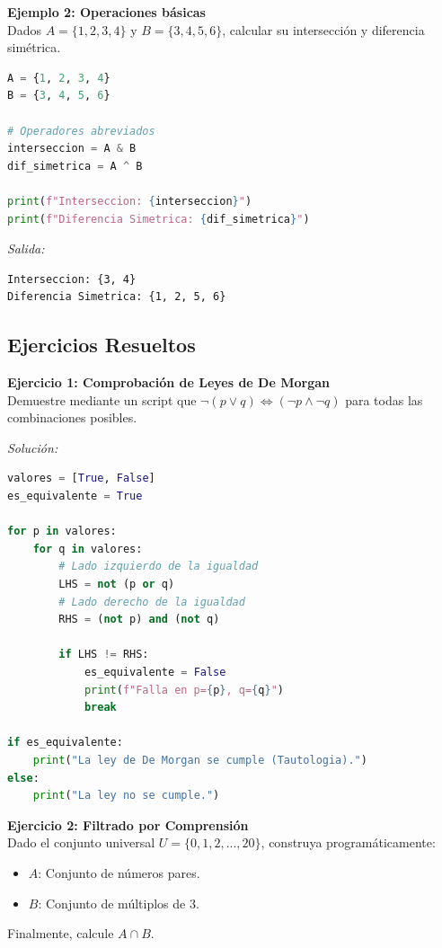 \noindent \textbf{Ejemplo 2: Operaciones básicas} \\
Dados $A = \{1, 2, 3, 4\}$ y $B = \{3, 4, 5, 6\}$, calcular su intersección y diferencia simétrica.

\begin{lstlisting}[language=Python, caption=Cálculo de intersección y diferencia simétrica]
A = {1, 2, 3, 4}
B = {3, 4, 5, 6}

# Operadores abreviados
interseccion = A & B
dif_simetrica = A ^ B

print(f"Interseccion: {interseccion}")
print(f"Diferencia Simetrica: {dif_simetrica}")
\end{lstlisting}

\noindent \textit{Salida:}
\begin{lstlisting}[language=bash, numbers=none, frame=none, backgroundcolor=\color{white}]
Interseccion: {3, 4}
Diferencia Simetrica: {1, 2, 5, 6}
\end{lstlisting}

\subsection{Ejercicios Resueltos}

\textbf{Ejercicio 1: Comprobación de Leyes de De Morgan} \\
Demuestre mediante un script que $\lnot (p \lor q) \iff (\lnot p \land \lnot q)$ para todas las combinaciones posibles.

\textit{Solución:}
\begin{lstlisting}[language=Python, caption=Validación Ley de De Morgan]
valores = [True, False]
es_equivalente = True

for p in valores:
    for q in valores:
        # Lado izquierdo de la igualdad
        LHS = not (p or q)
        # Lado derecho de la igualdad
        RHS = (not p) and (not q)
        
        if LHS != RHS:
            es_equivalente = False
            print(f"Falla en p={p}, q={q}")
            break

if es_equivalente:
    print("La ley de De Morgan se cumple (Tautologia).")
else:
    print("La ley no se cumple.")
\end{lstlisting}

\textbf{Ejercicio 2: Filtrado por Comprensión} \\
Dado el conjunto universal $U = \{0, 1, 2, ..., 20\}$, construya programáticamente:
\begin{itemize}
    \item $A$: Conjunto de números pares.
    \item $B$: Conjunto de múltiplos de 3.
\end{itemize}
Finalmente, calcule $A \cap B$.

